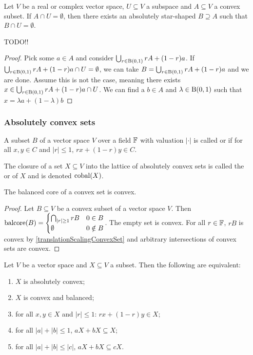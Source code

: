\begin{lemma}
Let $V$ be a real or complex vector space, $U\subseteq V$ a subspace and $A\subseteq V$ a convex subset. If $A\cap U = \emptyset$, then there exists an absolutely star-shaped $B\supseteq A$ such that $B\cap U = \emptyset$.
\end{lemma}
TODO!!
\begin{proof}
Pick some $a\in A$ and consider $\bigcup_{r\in \operatorname{B}(0,1)}rA + (1-r)a$. If $\bigcup_{r\in \operatorname{B}(0,1)}rA + (1-r)a\cap U = \emptyset$, we can take $B = \bigcup_{r\in \operatorname{B}(0,1)}rA + (1-r)a$ and we are done. Assume this is not the case, meaning there exists $x\in \bigcup_{r\in \operatorname{B}(0,1)}rA + (1-r)a\cap U$. We can find a $b\in A$ and $\lambda \in \operatorname{B}(0,1)$ such that $x = \lambda a + (1-\lambda) b$
\end{proof}

\subsubsection{Absolutely convex sets}
\begin{definition}
A subset $B$ of a vector space $V$ over a field $\mathbb{F}$ with valuation $|\cdot|$ is called  or  if for all $x,y\in C$ and $|r| \leq 1$, $rx + (1-r)y\in C$.

The closure of a set $X\subseteq V$ into the lattice of absolutely convex sets is called the  or  of $X$ and is denoted $\operatorname{cobal}(X)$.
\end{definition}

\begin{lemma} \label{balancedCoreConvexSet}
The balanced core of a convex set is convex.
\end{lemma}
\begin{proof}
Let $B\subseteq V$ be a convex subset of a vector space $V$. Then
$\operatorname{balcore}(B) = \begin{cases}
\bigcap_{|r|\geq 1}rB & 0\in B\\
\emptyset & 0\notin B
\end{cases}$. The empty set is convex. For all $r\in \mathbb{F}$, $rB$ is convex by \ref{translationScalingConvexSet} and arbitrary intersections of convex sets are convex.
\end{proof}

\begin{lemma}
Let $V$ be a vector space and $X\subseteq V$ a subset. Then the following are equivalent:
\begin{enumerate}
\item $X$ is absolutely convex;
\item $X$ is convex and balanced;
\item for all $x,y\in X$ and $|r| \leq 1$:  $rx + (1-r)y\in X$;
\item for all $|a|+|b| \leq 1$, $aX +bX \subseteq X$;
\item for all $|a|+|b| \leq |c|$, $aX +bX \subseteq cX$.
\end{enumerate}
\end{lemma}

